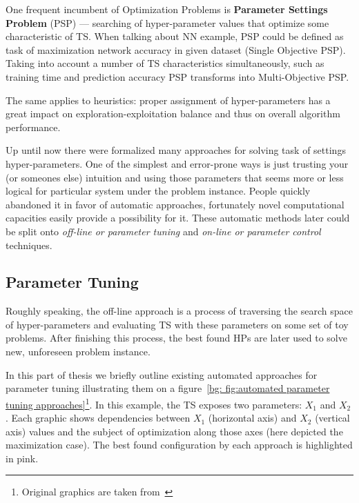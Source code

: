 One frequent incumbent of Optimization Problems is \textbf{Parameter Settings Problem} (PSP) — searching of hyper-parameter values that optimize some characteristic of TS. When talking about NN example, PSP could be defined as task of maximization network accuracy in given dataset (Single Objective PSP). Taking into account a number of TS characteristics simultaneously, such as training time and prediction accuracy PSP transforms into Multi-Objective PSP.

The same applies to heuristics: proper assignment of hyper-parameters has a great impact on exploration-exploitation balance and thus on overall algorithm performance.

Up until now there were formalized many approaches for solving task of settings hyper-parameters. 
One of the simplest and error-prone ways is just trusting your (or someones else) intuition and using those parameters that seems more or less logical for particular system under the problem instance. People quickly abandoned it in favor of automatic approaches, fortunately novel computational capacities easily provide a possibility for it. These automatic methods later could be split onto \textit{off-line or parameter tuning} and \textit{on-line or parameter control} techniques.


\subsection{Parameter Tuning}\label{bg: parameter tuning}
Roughly speaking, the off-line approach is a process of traversing the search space of hyper-parameters and evaluating TS with these parameters on some set of toy problems. After finishing this process, the best found HPs are later used to solve new, unforeseen problem instance.

In this part of thesis we briefly outline existing automated approaches for parameter tuning illustrating them on a figure~\ref{bg: fig:automated parameter tuning approaches}\footnote{Original graphics are taken from~\cite{koch2017automated}}. In this example, the TS exposes two parameters: $X_1$ and $X_2$. Each graphic shows dependencies between $X_1$ (horizontal axis) and $X_2$ (vertical axis) values and the subject of optimization along those axes (here depicted the maximization case). The best found configuration by each approach is highlighted in pink.

